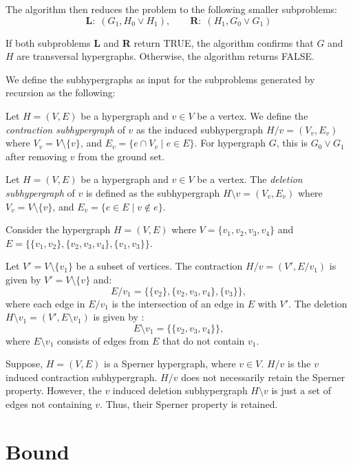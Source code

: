 The algorithm then reduces the problem to the following smaller subproblems:
\[
\textbf{L:}\ \ (G_1,H_0\vee H_1),\qquad\textbf{R:}\ \ (H_1,G_0\vee G_1)
\]

If both subproblems \textbf{L} and \textbf{R} return TRUE, the algorithm confirms that $G$ and $H$ are transversal hypergraphs. Otherwise, the algorithm returns FALSE.

We define the subhypergraphs as input for the subproblems generated by \FKA{} recursion as the following:

\begin{definition}\label{def:contraction}
Let $H=(V,E)$ be a hypergraph and $v\in V$ be a vertex. We define the \emph{contraction subhypergraph} of $v$ as the induced subhypergraph $H/v=(V_v,E_v)$ where $V_v=V\setminus\{v\}$, and $E_v=\{e\cap V_v\mid e\in E\}$. For hypergraph $G$, this is $G_0\vee G_1$ after removing $v$ from the ground set.
\end{definition}

\begin{definition}\label{def:deletion}
Let $H=(V,E)$ be a hypergraph and $v\in V$ be a vertex. The \emph{deletion subhypergraph} of $v$ is defined as the subhypergraph $H\setminus v=(V_v,E_v)$ where $V_v=V\setminus\{v\}$, and $E_v=\{e\in E\mid v\notin e\}$.
\end{definition}

\begin{example}
Consider the hypergraph $H=(V,E)$ where $V=\{v_1,v_2,v_3,v_4\}$ and $E=\{\{v_1,v_2\},\{v_2,v_3,v_4\},\{v_1,v_3\}\}$.

Let $V'=V\setminus\{v_1\}$ be a subset of vertices. The contraction $H/v=(V',E/v_1)$ is given by $V'=V\setminus\{v\}$ and:
\[
E/v_1=\{\{v_2\},\{v_2,v_3,v_4\},\{v_3\}\},
\]
where each edge in $E/v_1$ is the intersection of an edge in $E$ with $V'$. The deletion $H\setminus v_1=(V',E\setminus v_1)$ is given by :
\[
E\setminus v_1=\{\{v_2,v_3,v_4\}\},
\]
where $E\setminus v_1$ consists of edges from $E$ that do not contain $v_1$.
\end{example}

Suppose, $H=(V,E)$ is a Sperner hypergraph, where $v\in V$. $H/v$ is the $v$ induced contraction subhypergraph. $H/v$ does not necessarily retain the Sperner property. However, the $v$ induced deletion subhypergraph $H\setminus v$ is just a set of edges not containing $v$. Thus, their Sperner property is retained.

\section{\FKA{} Bound}

